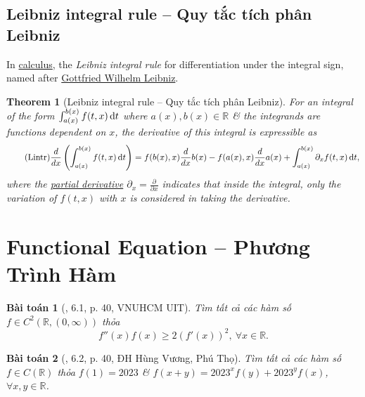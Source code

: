 \documentclass{article}
\newtheorem{baitoan}{Bài toán}
\newtheorem{theorem}{Theorem}
\begin{document}

\subsection{Leibniz integral rule -- Quy tắc tích phân Leibniz}
In \href{https://en.wikipedia.org/wiki/Calculus}{calculus}, the {\it Leibniz integral rule} for differentiation under the integral sign, named after \href{https://en.wikipedia.org/wiki/Gottfried_Wilhelm_Leibniz}{\sc Gottfried Wilhelm Leibniz}.

\begin{theorem}[Leibniz integral rule -- Quy tắc tích phân Leibniz]
	For an integral of the form $\int_{a(x)}^{b(x)} f(t,x)\,{\rm d}t$ where $a(x),b(x)\in\mathbb{R}$ \& the integrands are functions dependent on $x$, the derivative of this integral is expressible as
	\begin{equation}
		\label{Leibniz integral rule}
		\tag{Lintr}
		\frac{d}{dx}\left(\int_{a(x)}^{b(x)} f(t,x)\,{\rm d}t\right) = f(b(x),x)\frac{d}{dx}b(x) - f(a(x),x)\frac{d}{dx}a(x) + \int_{a(x)}^{b(x)} \partial_xf(t,x)\,{\rm d}t,
	\end{equation}
	where the \href{https://en.wikipedia.org/wiki/Partial_derivative}{partial derivative} $\partial_x = \frac{\partial}{\partial x}$ indicates that inside the integral, only the variation of $f(t,x)$ with $x$ is considered in taking the derivative.
\end{theorem}


\section{Functional Equation -- Phương Trình Hàm}

\begin{baitoan}[\cite{VMS_VMC2023}, 6.1, p. 40, VNUHCM UIT]
	Tìm tất cả các hàm số $f\in C^2(\mathbb{R},(0,\infty))$ thỏa
	\begin{equation*}
		f''(x)f(x)\ge2(f'(x))^2,\ \forall x\in\mathbb{R}.
	\end{equation*}
\end{baitoan}

\begin{baitoan}[\cite{VMS_VMC2023}, 6.2, p. 40, ĐH Hùng Vương, Phú Thọ]
	Tìm tất cả các hàm số $f\in C(\mathbb{R})$ thỏa $f(1) = 2023$ \& $f(x + y) = 2023^xf(y) + 2023^yf(x)$, $\forall x,y\in\mathbb{R}$.
\end{baitoan}
\end{document}
